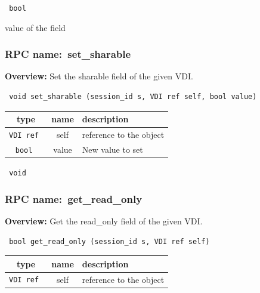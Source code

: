 {\tt 
bool
}


value of the field
\vspace{0.3cm}
\vspace{0.3cm}
\vspace{0.3cm}
\subsubsection{RPC name:~set\_sharable}

{\bf Overview:} 
Set the sharable field of the given VDI.

\begin{verbatim} void set_sharable (session_id s, VDI ref self, bool value)\end{verbatim}



 
\vspace{0.3cm}
\begin{tabular}{|c|c|p{7cm}|}
 \hline
{\bf type} & {\bf name} & {\bf description} \\ \hline
{\tt VDI ref } & self & reference to the object \\ \hline 

{\tt bool } & value & New value to set \\ \hline 

\end{tabular}

\vspace{0.3cm}

{\tt 
void
}



\vspace{0.3cm}
\vspace{0.3cm}
\vspace{0.3cm}
\subsubsection{RPC name:~get\_read\_only}

{\bf Overview:} 
Get the read\_only field of the given VDI.

\begin{verbatim} bool get_read_only (session_id s, VDI ref self)\end{verbatim}



 
\vspace{0.3cm}
\begin{tabular}{|c|c|p{7cm}|}
 \hline
{\bf type} & {\bf name} & {\bf description} \\ \hline
{\tt VDI ref } & self & reference to the object \\ \hline 

\end{tabular}

